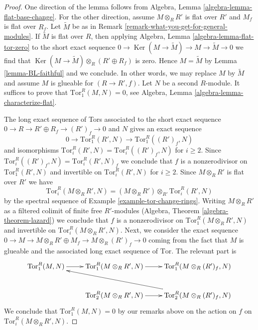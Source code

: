 \documentclass[10pt,a4paper]{amsart}
\theoremstyle{plain}
\theoremstyle{definition}
\theoremstyle{remark}
\numberwithin{equation}{subsection}
\def\Ker{\mathop{\mathrm{Ker}}}
\begin{document}
\begin{proof}
One direction of the lemma follows from
Algebra, Lemma \ref{algebra-lemma-flat-base-change}.
For the other direction, assume $M \otimes_R R'$
is flat over $R'$ and $M_f$ is flat over $R_f$.
Let $\tilde M$ be as in Remark \ref{remark-what-you-get-for-general-modules}.
If $\tilde M$ is flat over $R$, then applying
Algebra, Lemma \ref{algebra-lemma-flat-tor-zero}
to the short exact sequence
$0 \to \Ker(M \to \tilde M) \to M \to \tilde M \to 0$
we find that $\Ker(M \to \tilde M) \otimes_R (R' \oplus R_f)$ is zero.
Hence $M = \tilde M$ by Lemma \ref{lemma-BL-faithful} and we conclude.
In other words, we may replace $M$ by $\tilde M$ and assume
$M$ is glueable for $(R \to R', f)$. Let $N$ be a second $R$-module.
It suffices to prove that $\text{Tor}_1^R(M, N) = 0$, see
Algebra, Lemma \ref{algebra-lemma-characterize-flat}.

\medskip\noindent
The long exact sequence of Tors associated to the
short exact sequence $0 \to R \to R' \oplus R_f \to (R')_f \to 0$
and $N$ gives an exact sequence
$$
0 \to \text{Tor}_1^R(R', N) \to \text{Tor}_1^R((R')_f, N)
$$
and isomorphisms
$\text{Tor}_i^R(R', N) = \text{Tor}_i^R((R')_f, N)$
for $i \geq 2$. Since
$\text{Tor}_i^R((R')_f, N) = \text{Tor}_i^R(R', N)_f$
we conclude that $f$ is a nonzerodivisor on $\text{Tor}_1^R(R', N)$
and invertible on $\text{Tor}_i^R(R', N)$ for $i \geq 2$.
Since $M \otimes_R R'$ is flat over $R'$ we have
$$
\text{Tor}_i^R(M \otimes_R R', N) =
(M \otimes_R R') \otimes_{R'} \text{Tor}_i^R(R', N)
$$
by the spectral sequence of Example \ref{example-tor-change-rings}.
Writing $M \otimes_R R'$ as a filtered colimit of
finite free $R'$-modules (Algebra, Theorem \ref{algebra-theorem-lazard})
we conclude that $f$ is a nonzerodivisor
on $\text{Tor}_1^R(M \otimes_R R', N)$ and invertible on
$\text{Tor}_i^R(M \otimes_R R', N)$. Next, we consider
the exact sequence
$0 \to M \to M \otimes_R R' \oplus M_f \to M \otimes_R (R')_f \to 0$
coming from the fact that $M$ is glueable and the associated long exact
sequence of $\text{Tor}$. The relevant part is
$$
\xymatrix{
\text{Tor}_1^R(M, N) \ar[r] &
\text{Tor}_1^R(M \otimes_R R', N) \ar[r] &
\text{Tor}_1^R(M \otimes_R (R')_f, N) \\
& \text{Tor}_2^R(M \otimes_R R', N) \ar[r] &
\text{Tor}_2^R(M \otimes_R (R')_f, N) \ar[llu]
}
$$
We conclude that $\text{Tor}_1^R(M, N) = 0$ by our remarks above on the
action on $f$ on $\text{Tor}_i^R(M \otimes_R R', N)$.
\end{proof}
\end{document}
